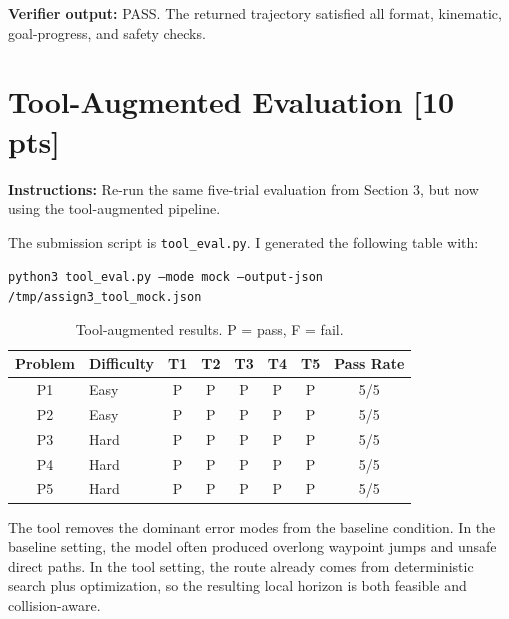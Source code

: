\documentclass[12pt]{article}
\begin{document}
\noindent\textbf{Verifier output:}
PASS. The returned trajectory satisfied all format, kinematic, goal-progress, and safety checks.

\newpage
\section{Tool-Augmented Evaluation \textnormal{[10 pts]}}
\label{sec:tool_eval_filled}

\textbf{Instructions:} Re-run the same five-trial evaluation from Section 3, but now using the
tool-augmented pipeline.

\medskip
\noindent
The submission script is \texttt{tool\_eval.py}. I generated the following table with:
\begin{center}
\texttt{python3 tool\_eval.py --mode mock --output-json /tmp/assign3\_tool\_mock.json}
\end{center}

\begin{table}[h]
    \centering
    \begin{tabular}{clcccccc}
        \toprule
        \textbf{Problem} & \textbf{Difficulty} & \textbf{T1} & \textbf{T2}
          & \textbf{T3} & \textbf{T4} & \textbf{T5}
          & \textbf{Pass Rate} \\
        \midrule
        P1 & Easy  & P & P & P & P & P & 5/5 \\
        P2 & Easy  & P & P & P & P & P & 5/5 \\
        P3 & Hard  & P & P & P & P & P & 5/5 \\
        P4 & Hard  & P & P & P & P & P & 5/5 \\
        P5 & Hard  & P & P & P & P & P & 5/5 \\
        \bottomrule
    \end{tabular}
    \caption{Tool-augmented results. P = pass, F = fail.}
\end{table}

\noindent
The tool removes the dominant error modes from the baseline condition. In the baseline setting,
the model often produced overlong waypoint jumps and unsafe direct paths. In the tool setting, the
route already comes from deterministic search plus optimization, so the resulting local horizon is
both feasible and collision-aware.

\newpage
\end{document}
